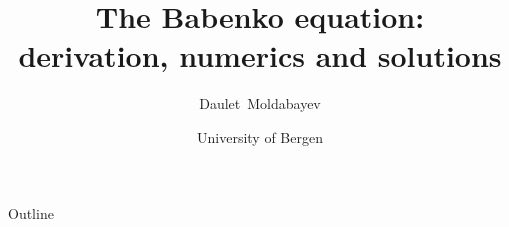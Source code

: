 \documentclass{beamer}
\title[] 
{
	The Babenko equation: \\ derivation, numerics and solutions \\
}
\author[]
{
  Daulet~Moldabayev
}
\date[]
{University of Bergen}
\begin{document}
\begin{frame}
  \maketitle
\end{frame}


\begin{frame}{Outline}
  \tableofcontents
\end{frame}



%

%
\end{document}
